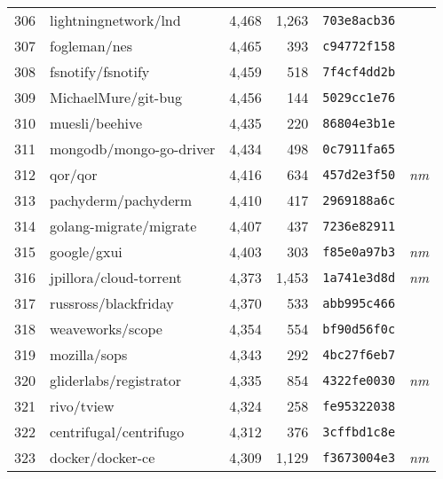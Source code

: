 {\begin{supertabular}{llrrll}
        306 &               lightningnetwork/lnd &  4,468 &  1,263 &  \texttt{703e8acb36} &              \\
        307 &                       fogleman/nes &  4,465 &    393 &  \texttt{c94772f158} &              \\
        308 &                  fsnotify/fsnotify &  4,459 &    518 &  \texttt{7f4cf4dd2b} &              \\
        309 &                MichaelMure/git-bug &  4,456 &    144 &  \texttt{5029cc1e76} &              \\
        310 &                     muesli/beehive &  4,435 &    220 &  \texttt{86804e3b1e} &              \\
        311 &            mongodb/mongo-go-driver &  4,434 &    498 &  \texttt{0c7911fa65} &              \\
        312 &                            qor/qor &  4,416 &    634 &  \texttt{457d2e3f50} &  \textit{nm} \\
        313 &                pachyderm/pachyderm &  4,410 &    417 &  \texttt{2969188a6c} &              \\
        314 &             golang-migrate/migrate &  4,407 &    437 &  \texttt{7236e82911} &              \\
        315 &                        google/gxui &  4,403 &    303 &  \texttt{f85e0a97b3} &  \textit{nm} \\
        316 &             jpillora/cloud-torrent &  4,373 &  1,453 &  \texttt{1a741e3d8d} &  \textit{nm} \\
        317 &               russross/blackfriday &  4,370 &    533 &  \texttt{abb995c466} &              \\
        318 &                   weaveworks/scope &  4,354 &    554 &  \texttt{bf90d56f0c} &              \\
        319 &                       mozilla/sops &  4,343 &    292 &  \texttt{4bc27f6eb7} &              \\
        320 &             gliderlabs/registrator &  4,335 &    854 &  \texttt{4322fe0030} &  \textit{nm} \\
        321 &                         rivo/tview &  4,324 &    258 &  \texttt{fe95322038} &              \\
        322 &             centrifugal/centrifugo &  4,312 &    376 &  \texttt{3cffbd1c8e} &              \\
        323 &                   docker/docker-ce &  4,309 &  1,129 &  \texttt{f3673004e3} &  \textit{nm} \\

\end{supertabular}}
